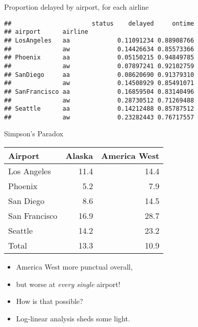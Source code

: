 \begin{frame}[fragile]{Proportion delayed by airport, for each airline}
  
\begin{knitrout}
\color{fgcolor}\begin{kframe}
\begin{alltt}
\hlkwb{=}\hlopt{~}\hlopt{+}\hlopt{+}
\hlkwb{=}\hlstd{=}\hlstd{(}\hlstd{,}\hlstd{))}
\hlstd{=}\hlstd{(}\hlstd{,}\hlstd{),}
\hlstd{=}\hlstd{)}
\end{alltt}
\begin{verbatim}
##                      status    delayed     ontime
## airport      airline                             
## LosAngeles   aa             0.11091234 0.88908766
##              aw             0.14426634 0.85573366
## Phoenix      aa             0.05150215 0.94849785
##              aw             0.07897241 0.92102759
## SanDiego     aa             0.08620690 0.91379310
##              aw             0.14508929 0.85491071
## SanFrancisco aa             0.16859504 0.83140496
##              aw             0.28730512 0.71269488
## Seattle      aa             0.14212488 0.85787512
##              aw             0.23282443 0.76717557
\end{verbatim}
\end{kframe}
\end{knitrout}


\end{frame}


\begin{frame}{Simpson's Paradox}

\begin{tabular}{|l|rr|}
  \hline
  Airport & Alaska & America West\\
  \hline
  Los Angeles & 11.4 & 14.4\\
  Phoenix & 5.2 & 7.9\\
  San Diego & 8.6 & 14.5\\
  San Francisco & 16.9 & 28.7\\
  Seattle & 14.2 & 23.2 \\
  \hline
  Total & 13.3 & 10.9 \\
  \hline
  
\end{tabular}

  \begin{itemize}
  \item America West more punctual overall,
  \item but worse at \emph{every single} airport!
  \item How is that possible?
  \item Log-linear analysis sheds some light.
  \end{itemize}
  
\end{frame}

